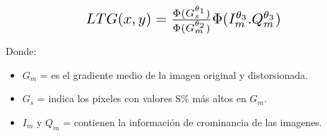 \documentclass[spanish,twocolumn]{article}
\begin{document}
\begin{equation}\label{eq:ltg}
\resizebox{.6\hsize}{!}
{
$LTG(x,y) =\frac{\Phi(G_{s}^{\theta_1})}{\Phi(G_{m}^{\theta_2})} \Phi(I_{m}^{\theta_3}.Q_{m}^{\theta_3})$
}
\end{equation}

Donde:
\begin{itemize}
 \item $G_{m}$ =  es el gradiente medio de la imagen original y distorsionada.
 \item $ G_{s}$ = indica los pixeles con valores S\% más altos en $G_{m}$.
 \item  $I_{m}$ y $Q_{m}$ = contienen la información de crominancia de las imagenes. 
\end{itemize} 

%
%
\end{document}

